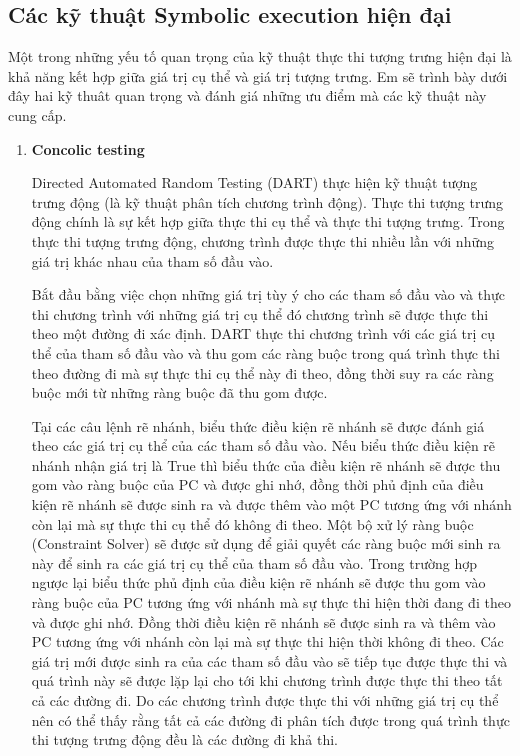 \documentclass[12pt,a4paper]{report}
\begin{document}
\subsection{Các kỹ thuật Symbolic execution hiện đại}

Một trong những yếu tố quan trọng của kỹ thuật thực thi tượng trưng hiện đại là khả năng kết hợp giữa giá trị cụ thể và giá trị tượng trưng. Em sẽ trình bày dưới đây hai kỹ thuât quan trọng và đánh giá những ưu điểm mà các kỹ thuật này cung cấp.

\begin{enumerate}
\item \textbf{Concolic testing}

Directed Automated Random Testing (DART) \cite{ganesh2007decision} thực hiện kỹ thuật tượng trưng động (là kỹ thuật phân tích chương trình động). Thực thi tượng trưng động chính là sự kết hợp giữa thực thi cụ thể và thực thi tượng trưng. Trong thực thi tượng trưng động, chương trình được thực thi nhiều lần với những giá trị khác nhau của tham số đầu vào.

Bắt đầu bằng việc chọn những giá trị tùy ý cho các tham số đầu vào và thực thi chương trình với những giá trị cụ thể đó chương trình sẽ được thực thi theo một đường đi xác định. DART thực thi chương trình với các giá trị cụ thể của tham số đầu vào và thu gom các ràng buộc trong quá trình thực thi theo đường đi mà sự thực thi cụ thể này đi theo, đồng thời suy ra các ràng buộc mới từ những ràng buộc đã thu gom được.

Tại các câu lệnh rẽ nhánh, biểu thức điều kiện rẽ nhánh sẽ được đánh giá theo các giá trị cụ thể của các tham số đầu vào. Nếu biểu thức điều kiện rẽ nhánh nhận giá trị là True thì biểu thức của điều kiện rẽ nhánh sẽ được thu gom vào ràng buộc của PC và được ghi nhớ, đồng thời phủ định của điều kiện rẽ nhánh sẽ được sinh ra và được thêm vào một PC tương ứng với nhánh còn lại mà sự thực thi cụ thể đó không đi theo. Một bộ xử lý ràng buộc (Constraint Solver) sẽ được sử dụng để giải quyết các ràng buộc mới sinh ra này để sinh ra các giá trị cụ thể của tham số đầu vào. Trong trường hợp ngược lại biểu thức phủ định của điều kiện rẽ nhánh sẽ được thu gom vào ràng buộc của PC tương ứng với nhánh mà sự thực thi hiện thời đang đi theo và được ghi nhớ. Đồng thời điều kiện rẽ nhánh sẽ được sinh ra và thêm vào PC tương ứng với nhánh còn lại mà sự thực thi hiện thời không đi theo. Các giá trị mới được sinh ra của các tham số đầu vào sẽ tiếp tục được thực thi và quá trình này sẽ được lặp lại cho tới khi chương trình được thực thi theo tất cả các đường đi. Do các chương trình được thực thi với những giá trị cụ thể nên có thể thấy rằng tất cả các đường đi phân tích được trong quá trình thực thi tượng trưng động đều là các đường đi khả thi.


\end{enumerate}
\end{document}

